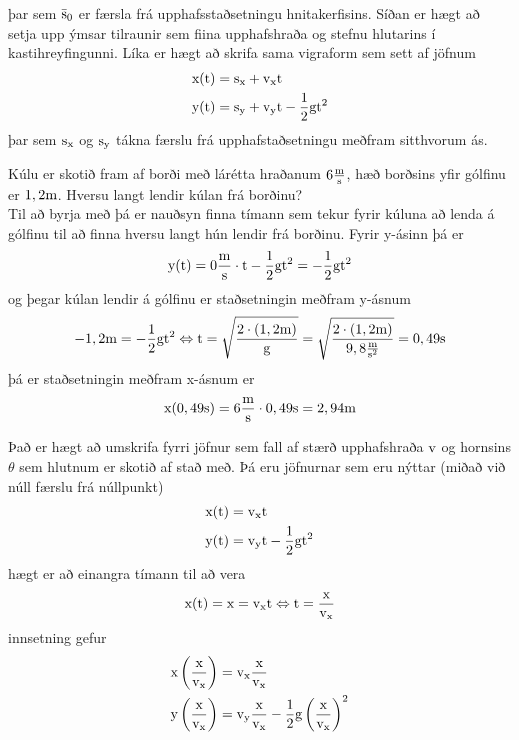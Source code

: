 þar sem $\bar{\textrm{s}}_0$ er færsla frá upphafsstaðsetningu hnitakerfisins. Síðan
er hægt að setja upp ýmsar tilraunir sem fiina upphafshraða og
stefnu hlutarins í kastihreyfingunni. Líka er hægt að skrifa sama vigraform
sem sett af jöfnum
\begin{align}
	\text{x}(\textrm{t}) &= \textrm{s}_\text{x} + \textrm{v}_\text{x} \textrm{t} \\
	\text{y}(\textrm{t}) &= \textrm{s}_\text{y} + \textrm{v}_\text{y} \textrm{t} - \frac{1}{2} \textrm{g} \textrm{t}^2
\end{align}
þar sem $\textrm{s}_\text{x}$ og $\textrm{s}_\text{y}$ tákna færslu frá upphafstaðsetningu
meðfram sitthvorum ás.

\begin{formalexample}
Kúlu er skotið fram af borði með lárétta hraðanum $6 \frac{\textrm{m}}{\textrm{s}}$, hæð borðsins yfir gólfinu er
$1,2 \textrm{m}$. Hversu langt lendir kúlan frá borðinu?
\\[4 ex]
Til að byrja með þá er nauðsyn finna tímann sem tekur fyrir kúluna að lenda á gólfinu
til að finna hversu langt hún lendir frá borðinu. Fyrir y-ásinn þá er  
\[
	\text{y}(\textrm{t}) = 0 \frac{\textrm{m}}{\textrm{s}} \cdot \textrm{t} - \frac{1}{2} \textrm{g} \textrm{t}^2
		= - \frac{1}{2} \textrm{g} \textrm{t}^2
\]
og þegar kúlan lendir á gólfinu er staðsetningin meðfram y-ásnum
\[
	-1,2 \textrm{m} = - \frac{1}{2} \textrm{g} \textrm{t}^2 
		\Leftrightarrow
		\textrm{t} = \sqrt{ \frac{2 \cdot (1,2 \textrm{m})}{\textrm{g}}}
			= \sqrt{ \frac{2 \cdot (1,2 \textrm{m})}{ 9,8 \frac{\textrm{m}}{\textrm{s}^2}}}
			= 0,49 \textrm{s}
\]
þá er staðsetningin meðfram x-ásnum er 
\[
	\text{x}(0,49 \textrm{s}) = 6 \frac{\textrm{m}}{\textrm{s}} \cdot 0,49 \textrm{s} = 2,94 \textrm{m}
\]
\end{formalexample}
Það er hægt að umskrifa fyrri jöfnur sem fall af stærð upphafshraða $\textrm{v}$
og hornsins $\theta$ sem hlutnum er skotið af stað með. Þá eru jöfnurnar sem
eru nýttar (miðað við núll færslu frá núllpunkt)
\begin{align*}
	\text{x}(\textrm{t}) &= \textrm{v}_\text{x} \textrm{t} \\
	\text{y}(\textrm{t}) &= \textrm{v}_\text{y} \textrm{t} - \frac{1}{2} \textrm{g} \textrm{t}^2
\end{align*}
hægt er að einangra tímann til að vera
\[
	\text{x}(\textrm{t}) = \text{x} = \textrm{v}_\text{x} \textrm{t} 
		\Leftrightarrow
		\textrm{t} = \frac{\text{x}}{\textrm{v}_\text{x}}
\]
innsetning gefur
\begin{align*}
	\text{x} \left( \frac{\text{x}}{\textrm{v}_\text{x}} \right) &= \textrm{v}_\text{x} \frac{\text{x}}{\textrm{v}_\text{x}} \\
	\text{y} \left( \frac{\text{x}}{\textrm{v}_\text{x}} \right) &= \textrm{v}_\text{y} \frac{\text{x}}{\textrm{v}_\text{x}} 
		- \frac{1}{2} \textrm{g} \left( \frac{\text{x}}{\textrm{v}_\text{x}} \right)^2
\end{align*}
